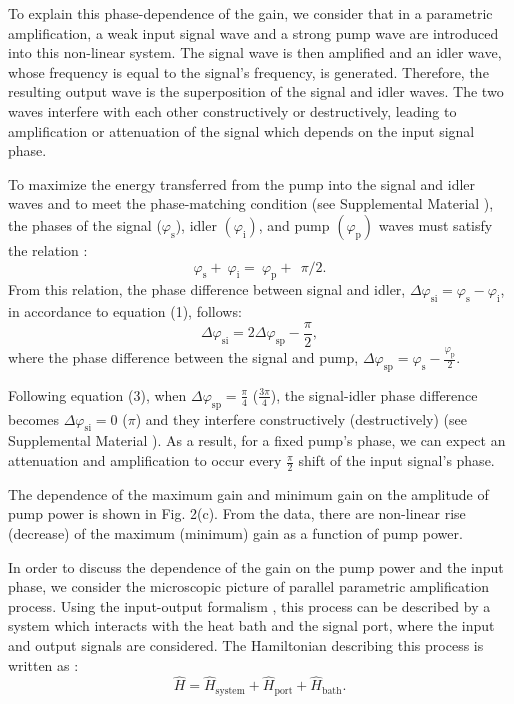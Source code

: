 \documentclass[%
 reprint,
 amsmath,amssymb,
 aps,
prb,
]{revtex4-2}
\begin{document}
To explain this phase-dependence of the gain, we consider that in a parametric amplification, a weak input signal wave and a strong pump wave are introduced into this non-linear system. The signal wave is then amplified and an idler wave, whose frequency is equal to the signal's frequency, is generated. Therefore, the resulting output wave is the superposition of the signal and idler waves. The two waves interfere with each other constructively or destructively, leading to amplification or attenuation of the signal which depends on the input signal phase.

To maximize the energy transferred from the pump into the signal and idler waves \cite{Brach2017,Lvov,Zakharov1975} and to meet the phase-matching condition (see Supplemental Material \cite{Suppl}), the phases of the signal ($\varphi_\mathrm{s}$), idler $(\varphi_\mathrm{i})$, and pump $(\varphi_\mathrm{p})$ waves must satisfy the relation  :
\begin{equation}
    \varphi_\mathrm{s}+\ \varphi_\mathrm{i}=\ \varphi_\mathrm{p}+\ \ \pi/2.
\end{equation}
From this relation, the phase difference between signal and idler, $\Delta \varphi_\mathrm{si}=\varphi_\mathrm{s} - \varphi_\mathrm{i}$,  in accordance to equation (1), follows:
\begin{equation}
    \Delta \varphi_\mathrm{si} = 2\Delta \varphi_\mathrm{sp} - \frac{\pi}{2},
\end{equation}
where the phase difference between the signal and pump,  $\Delta \varphi_\mathrm{sp}=\varphi_\mathrm{s} - \frac{\varphi_\mathrm{p}}{2}$.

Following equation (3), when $\Delta \varphi_{\mathrm{sp}} = \frac{\pi}{4}$ ($\frac{3\pi}{4}$), the signal-idler phase difference becomes  $\Delta \varphi_{\mathrm{si}} = 0$ ($\pi$) and they interfere constructively (destructively) (see Supplemental Material \cite{Suppl}). As a result, for a fixed pump's phase, we can expect an attenuation and amplification to occur every $\frac{\pi}{2}$ shift of the input signal's phase.

The dependence of the maximum gain and minimum gain on the amplitude of pump power is shown in Fig. 2(c). From the data, there are non-linear rise (decrease) of the maximum (minimum) gain as a function of pump power.

In order to discuss the dependence of the gain on the pump power and the input phase, we consider the microscopic picture of parallel parametric amplification process. Using the input-output formalism \cite{Walls, Yamamoto2016}, this process can be described by a system which interacts with the heat bath and the signal port, where the input and output signals are considered. The Hamiltonian describing this process is written as \cite{Yamamoto2016}:
\begin{equation}
    {\hat{H}}=  \hat{H}_{\mathrm{system}}+{\hat{H}}_{\mathrm{port}}+{\hat{H}}_{\mathrm{bath}}.
\end{equation}
\end{document}
